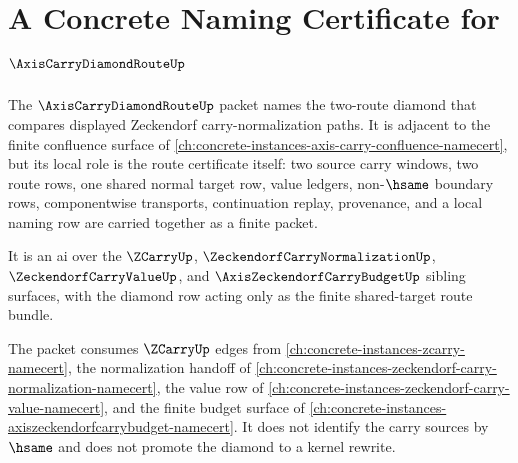 \chapter{A Concrete Naming Certificate for $\AxisCarryDiamondRouteUp$}
\label{ch:concrete-instances-axis-carry-diamond-route-namecert}

The $\AxisCarryDiamondRouteUp$ packet names the two-route diamond that compares displayed Zeckendorf carry-normalization paths. It is adjacent to the finite confluence surface of \autoref{ch:concrete-instances-axis-carry-confluence-namecert}, but its local role is the route certificate itself: two source carry windows, two route rows, one shared normal target row, value ledgers, non-$\hsame$ boundary rows, componentwise transports, continuation replay, provenance, and a local naming row are carried together as a finite packet.

It is an ai over the $\ZCarryUp$, $\ZeckendorfCarryNormalizationUp$, $\ZeckendorfCarryValueUp$, and $\AxisZeckendorfCarryBudgetUp$ sibling surfaces, with the diamond row acting only as the finite shared-target route bundle.



The packet consumes $\ZCarryUp$ edges from \autoref{ch:concrete-instances-zcarry-namecert}, the normalization handoff of \autoref{ch:concrete-instances-zeckendorf-carry-normalization-namecert}, the value row of \autoref{ch:concrete-instances-zeckendorf-carry-value-namecert}, and the finite budget surface of \autoref{ch:concrete-instances-axiszeckendorfcarrybudget-namecert}. It does not identify the carry sources by $\hsame$ and does not promote the diamond to a kernel rewrite.

